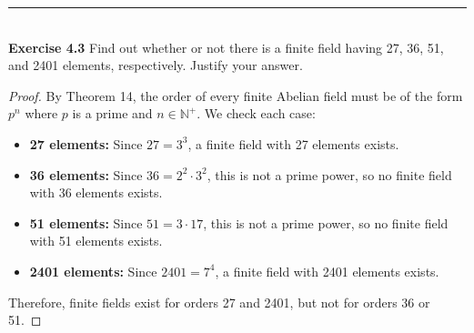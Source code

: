 \documentclass[a4paper]{article}
\begin{document}
\noindent\rule{12cm}{0.4pt}\\
\noindent \textbf{Exercise 4.3} Find out whether or not there is a finite field having 27, 36, 51, and 2401 elements, respectively. Justify your answer.
\begin{proof}
By Theorem 14, the order of every finite Abelian field must be of the form $p^n$ where $p$ is a prime and $n \in \mathbb{N}^{+}$. We check each case:

\begin{itemize}
\item \textbf{27 elements:} Since $27 = 3^3$, a finite field with 27 elements exists.
\item \textbf{36 elements:} Since $36 = 2^2 \cdot 3^2$, this is not a prime power, so no finite field with 36 elements exists.
\item \textbf{51 elements:} Since $51 = 3 \cdot 17$, this is not a prime power, so no finite field with 51 elements exists.
\item \textbf{2401 elements:} Since $2401 = 7^4$, a finite field with 2401 elements exists.
\end{itemize}

Therefore, finite fields exist for orders 27 and 2401, but not for orders 36 or 51.
\end{proof}
\end{document}
